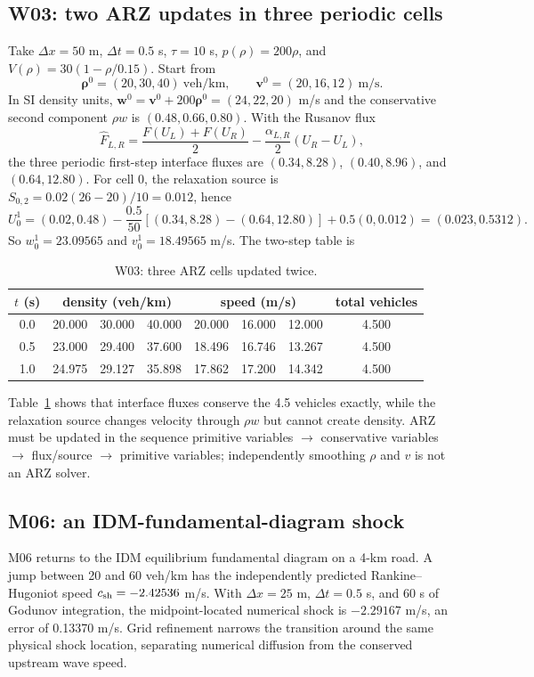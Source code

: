 \documentclass[11pt,a4paper,openany]{book}
\numberwithin{equation}{chapter}
\numberwithin{figure}{chapter}
\numberwithin{table}{chapter}
\begin{document}
\subsection{W03: two ARZ updates in three periodic cells}
Take $\Delta x=50$ m, $\Delta t=0.5$ s, $\tau=10$ s, $p(\rho)=200\rho$, and $V(\rho)=30(1-\rho/0.15)$. Start from
\[
\bm\rho^0=(20,30,40)\ \mathrm{veh/km},\qquad\bm v^0=(20,16,12)\ \mathrm{m/s}.
\]
In SI density units, $\bm w^0=\bm v^0+200\bm\rho^0=(24,22,20)$ m/s and the conservative second component $\rho w$ is $(0.48,0.66,0.80)$. With the Rusanov flux
\begin{equation}
\widehat F_{L,R}=\frac{F(U_L)+F(U_R)}2-\frac{\alpha_{L,R}}2(U_R-U_L),
\end{equation}
the three periodic first-step interface fluxes are $(0.34,8.28)$, $(0.40,8.96)$, and $(0.64,12.80)$. For cell 0, the relaxation source is $S_{0,2}=0.02(26-20)/10=0.012$, hence
\begin{equation}
U_0^1=(0.02,0.48)-\frac{0.5}{50}[(0.34,8.28)-(0.64,12.80)]+0.5(0,0.012)=(0.023,0.5312).
\end{equation}
So $w_0^1=23.09565$ and $v_0^1=18.49565$ m/s. The two-step table is
\begin{table}[htbp]\centering\caption{W03: three ARZ cells updated twice.}\label{tab:w03}
\begin{tabular}{c|ccc|ccc|c}\toprule
$t$ (s)&\multicolumn{3}{c|}{density (veh/km)}&\multicolumn{3}{c|}{speed (m/s)}&total vehicles\\\midrule
0.0&20.000&30.000&40.000&20.000&16.000&12.000&4.500\\
0.5&23.000&29.400&37.600&18.496&16.746&13.267&4.500\\
1.0&24.975&29.127&35.898&17.862&17.200&14.342&4.500\\\bottomrule
\end{tabular}\end{table}
Table~\ref{tab:w03} shows that interface fluxes conserve the 4.5 vehicles exactly, while the relaxation source changes velocity through $\rho w$ but cannot create density. ARZ must be updated in the sequence primitive variables $\to$ conservative variables $\to$ flux/source $\to$ primitive variables; independently smoothing $\rho$ and $v$ is not an ARZ solver.

\subsection{M06: an IDM-fundamental-diagram shock}
M06 returns to the IDM equilibrium fundamental diagram on a 4-km road. A jump between 20 and 60 veh/km has the independently predicted Rankine--Hugoniot speed $c_{\rm sh}=-2.42536$ m/s. With $\Delta x=25$ m, $\Delta t=0.5$ s, and 60 s of Godunov integration, the midpoint-located numerical shock is $-2.29167$ m/s, an error of 0.13370 m/s. Grid refinement narrows the transition around the same physical shock location, separating numerical diffusion from the conserved upstream wave speed.
\end{document}
